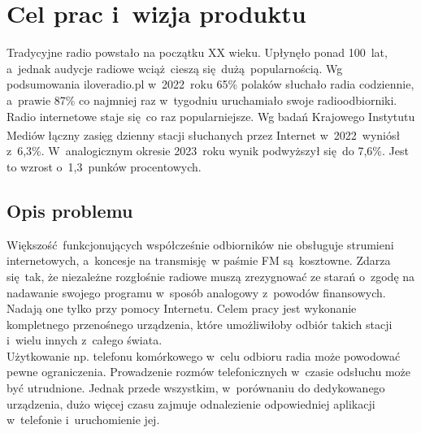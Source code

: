 \documentclass[polish]{aghengthesis}
\author{Norbert Morawski}
\date{\the\year}
\begin{document}
\lstset{inputencoding=utf8, basicstyle=\ttfamily}

\maketitle

\tableofcontents

\chapter{Cel prac i~wizja produktu}

	Tradycyjne radio powstało na początku XX wieku. Upłynęło ponad 100~lat, a~jednak audycje radiowe wciąż cieszą się dużą popularnością. Wg podsumowania iloveradio.pl\textsuperscript{\cite{iloveradio_stats}} w~2022~roku 65\% polaków słuchało radia codziennie, a~prawie 87\% co najmniej raz w~tygodniu uruchamiało swoje radioodbiorniki. 
	$ $\\
	
	Radio internetowe staje się co raz popularniejsze. Wg badań Krajowego Instytutu Mediów\textsuperscript{\cite{kim_2022} \cite{kim_2023}} łączny zasięg dzienny stacji słuchanych przez Internet w~2022~wyniósł z~6,3\%. W~analogicznym okresie 2023~roku wynik podwyższył się do 7,6\%. Jest to wzrost o~1,3~punków procentowych.
	
	\section{Opis problemu}
		Większość funkcjonujących współcześnie odbiorników nie obsługuje strumieni internetowych, a~koncesje na transmisję w paśmie FM są kosztowne. Zdarza się tak, że niezależne rozgłośnie radiowe muszą zrezygnować ze starań o~zgodę na nadawanie swojego programu w~sposób analogowy\textsuperscript{\cite{r357_krrit}} z~powodów finansowych.
		Nadają one tylko przy pomocy Internetu.
		Celem pracy jest wykonanie kompletnego przenośnego urządzenia, które umożliwiłoby odbiór takich stacji i~wielu innych z~całego świata.
		$ $\\
		
		Użytkowanie np. telefonu komórkowego w~celu odbioru radia może powodować pewne ograniczenia. Prowadzenie rozmów telefonicznych w~czasie odsłuchu może być utrudnione. Jednak przede wszystkim, w~porównaniu do dedykowanego urządzenia, dużo więcej czasu zajmuje odnalezienie odpowiedniej aplikacji w~telefonie i~uruchomienie jej.
		
\end{document}
